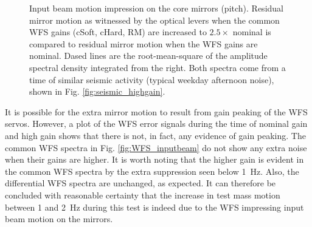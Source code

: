 \begin{figure}
\begin{centering}
\caption[Impression of input beam motion on the core mirrors]{Input
  beam motion impression on the core mirrors (pitch). Residual mirror
  motion as witnessed by the optical levers when the common WFS gains
  (cSoft, cHard, RM) are increased to $2.5\times$ nominal is compared
  to residual mirror motion when the WFS gains are nominal. Dased
  lines are the root-mean-square of the amplitude spectral density
  integrated from the right. Both spectra come from a time of similar
  seismic activity (typical weekday afternoon noise), shown in
  Fig. \ref{fig:seismic_highgain}.}
\label{fig:inputbeam_impression}
\end{centering}
\end{figure}

It is possible for the extra mirror motion to result from gain peaking
of the WFS servos. However, a plot of the WFS error signals during the
time of nominal gain and high gain shows that there is not, in fact,
any evidence of gain peaking. The common WFS spectra in
Fig. \ref{fig:WFS_inputbeam} do not show any extra noise when their
gains are higher. It is worth noting that the higher gain is evident
in the common WFS spectra by the extra suppression seen below
1~Hz. Also, the differential WFS spectra are unchanged, as
expected. It can therefore be concluded with reasonable certainty that
the increase in test mass motion between 1 and 2~Hz during this test
is indeed due to the WFS impressing input beam motion on the mirrors.

